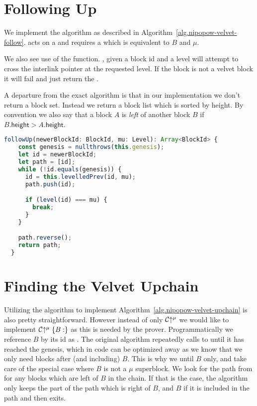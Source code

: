 \section{Following Up}
We implement the  algorithm as described in Algorithm~\ref{alg.nipopow-velvet-follow}.  acts on a  and requires a  which is equivalent to $B$ and $\mu$.

We also see use of the  function. , given a block id and a level will attempt to cross the interlink pointer at the requested level. If the block is not a velvet block it will fail and just return the .

A departure from the exact algorithm is that in our implementation we don't return a block set. Instead we return a block list which is sorted by height. By convention we also say that a block $A$ is \textit{left} of another block $B$ if $B.\mathsf{height} > A.\mathsf{height}$.

\begin{lstlisting}[language=Javascript]
  followUp(newerBlockId: BlockId, mu: Level): Array<BlockId> {
    const genesis = nullthrows(this.genesis);
    let id = newerBlockId;
    let path = [id];
    while (!id.equals(genesis)) {
      id = this.levelledPrev(id, mu);
      path.push(id);

      if (level(id) === mu) {
        break;
      }
    }

    path.reverse();
    return path;
  }
\end{lstlisting}

\section{Finding the Velvet Upchain}
Utilizing the  algorithm to implement Algorithm~\ref{alg.nipopow-velvet-upchain} is also pretty straightforward. However instead of only $\mathcal{C} \negthickspace\uparrow^\mu$ we would like to implement $\mathcal{C}\negthickspace\uparrow^\mu\{B:\}$ as this is needed by the prover. Programmatically we reference $B$ by its id as  . The original algorithm repeatedly calls to  until it has reached the genesis, which in code can be optimized away as we know that we only need blocks after (and including) $B$. This is why we  until $B$ only, and take care of the special case where $B$ is not a $\mu$ superblock. We look for the path from  for any blocks which are left of $B$ in the chain. If that is the case, the algorithm only keeps the part of the path which is right of $B$, and $B$ if it is included in the path and then exits.

